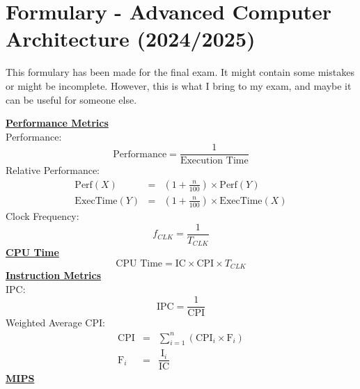 \documentclass[a4paper,12pt]{article}
\begin{document}
    \section*{Formulary - Advanced Computer Architecture (2024/2025)}

    This formulary has been made for the final exam. It might contain some mistakes or might be incomplete. However, this is what I bring to my exam, and maybe it can be useful for someone else.

    \pagebreak

    \begin{multicols}{2}

    \textbf{\underline{Performance Metrics}}
    \\
    Performance:
    \begin{equation*}
        \text{Performance} = \frac{1}{\text{Execution Time}}
    \end{equation*}
    Relative Performance:
    \begin{equation*}
        \begin{array}{rcl}
            \text{Perf}(X) &=& \left(1+\frac{n}{100}\right) \times \text{Perf}(Y) \\ [.5em]
            \text{ExecTime}(Y) &=& \left(1+\frac{n}{100}\right) \times \text{ExecTime}(X)
        \end{array}
    \end{equation*}
    Clock Frequency:
    \begin{equation*}
        f_{CLK} = \frac{1}{T_{CLK}}
    \end{equation*}
    \textbf{\underline{CPU Time}}
    \begin{equation*}
        \text{CPU Time} = \text{IC} \times \text{CPI} \times T_{CLK}
    \end{equation*}
    \textbf{\underline{Instruction Metrics}}
    \\
    IPC:
    \begin{equation*}
        \text{IPC} = \frac{1}{\text{CPI}}
    \end{equation*}
    Weighted Average CPI:
    \begin{equation*}
        \begin{array}{rcl}
            \text{CPI} &=& \displaystyle\sum_{i=1}^{n} (\text{CPI}_i \times \text{F}_i) \\ [1.4em]
            \text{F}_i &=& \dfrac{\text{I}_i}{\text{IC}}
        \end{array}
    \end{equation*}
    \textbf{\underline{MIPS}}

\end{multicols}
\end{document}
